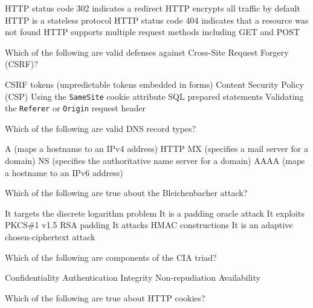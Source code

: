 \documentclass[addpoints]{exam}
\begin{document}
\begin{questions}
\begin{checkboxes}
  \CorrectChoice HTTP status code 302 indicates a redirect
  \choice HTTP encrypts all traffic by default
  \CorrectChoice HTTP is a stateless protocol
  \CorrectChoice HTTP status code 404 indicates that a resource was not found
  \CorrectChoice HTTP supports multiple request methods including GET and POST
\end{checkboxes}



\question Which of the following are valid defenses against Cross-Site Request Forgery (CSRF)?

\begin{checkboxes}
  \CorrectChoice CSRF tokens (unpredictable tokens embedded in forms)
  \choice Content Security Policy (CSP)
  \CorrectChoice Using the \texttt{SameSite} cookie attribute
  \choice SQL prepared statements
  \CorrectChoice Validating the \texttt{Referer} or \texttt{Origin} request header
\end{checkboxes}


\question Which of the following are valid DNS record types?

\begin{checkboxes}
  \CorrectChoice A (maps a hostname to an IPv4 address)
  \choice HTTP
  \CorrectChoice MX (specifies a mail server for a domain)
  \CorrectChoice NS (specifies the authoritative name server for a domain)
  \CorrectChoice AAAA (maps a hostname to an IPv6 address)
\end{checkboxes}


\question Which of the following are true about the Bleichenbacher attack?

\begin{checkboxes}
  \choice It targets the discrete logarithm problem
  \CorrectChoice It is a padding oracle attack
  \CorrectChoice It exploits PKCS\#1 v1.5 RSA padding
  \choice It attacks HMAC constructions
  \CorrectChoice It is an adaptive chosen-ciphertext attack
\end{checkboxes}



\question Which of the following are components of the CIA triad?

\begin{checkboxes}
  \CorrectChoice Confidentiality
  \choice Authentication
  \CorrectChoice Integrity
  \choice Non-repudiation
  \CorrectChoice Availability
\end{checkboxes}


\question Which of the following are true about HTTP cookies?


\end{questions}
\end{document}
